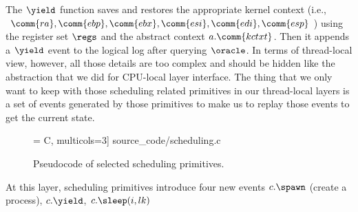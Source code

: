 \begin{small}
\ifTR{}{\vspace{-10px}}
\begin{mathpar}
\end{mathpar}
\end{small}%
The $\yield$ function saves and restores the 
appropriate kernel context (i.e., $\comm{ra},
\comm{ebp}, \comm{ebx}, \comm{esi}, \comm{edi}, \comm{esp}$) using the register 
set $\regs$ and the abstract context $a.  \comm{kctxt}$.
Then it appends a  $\yield$  event to the logical log
after querying  $\oracle$.
In terms of thread-local view, however, all those details are too complex and should be hidden
like the abstraction that we did for CPU-local layer interface.
The thing that we only want to keep with those scheduling related primitives in our thread-local layers is 
a set of events generated by those primitives to make us to replay those events to get the current state.
\begin{figure}
 = C, multicols=3] {source_code/scheduling.c}
\vspace{-14pt}
\caption{Pseudocode of selected scheduling primitives.}
\label{fig:exp:sched}
\vspace{-5pt}
\end{figure}
\noindent{}At this  layer,  scheduling primitives introduce four new events
$c.\spawn$ (create a process), $c.\yield$, $c.\sleep(i, lk)$
